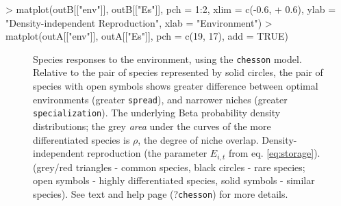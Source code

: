 \begin{Schunk}
\begin{Sinput}
> matplot(outB[["env"]], outB[["Es"]], pch = 1:2, xlim = c(-0.6, 
+     0.6), ylab = "Density-independent Reproduction", xlab = "Environment")
> matplot(outA[["env"]], outA[["Es"]], pch = c(19, 17), add = TRUE)
\end{Sinput}
\end{Schunk}
\begin{figure}[ht]
  \centering
  \caption{Species responses to the environment, using the \texttt{chesson} model. Relative to the pair of species represented by solid circles, the pair of species with open symbols shows greater difference between optimal environments (greater \texttt{spread}), and narrower niches (greater \texttt{specialization}).   The underlying Beta probability density distributions; the grey \emph{area} under the curves of the more differentiated species is $\rho$, the degree of niche overlap.   Density-independent reproduction (the parameter $E_{i,t}$ from eq. \ref{eq:storage}). (grey/red triangles - common species, black circles - rare species; open symbols - highly differentiated species, solid symbols - similar species). See text and help page (?\texttt{chesson}) for more details.}
  \label{fig:chess}
\end{figure}

